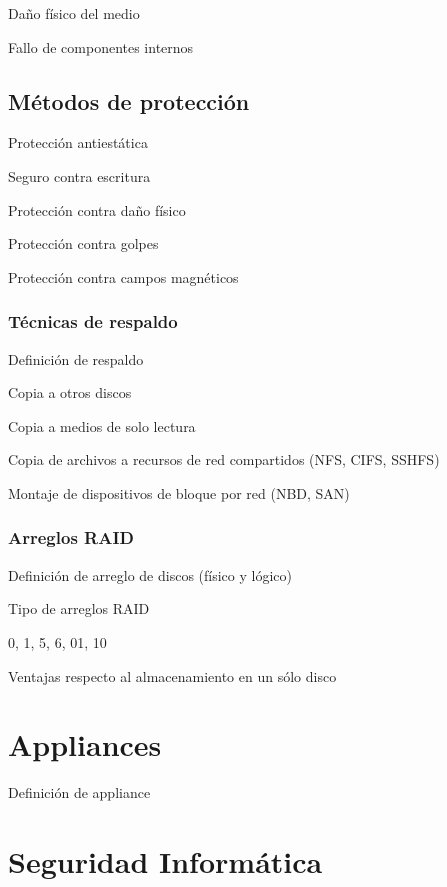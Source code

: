 Da\~{n}o f\'{i}sico del medio

Fallo de componentes internos



      \subsection {M\'{e}todos de protecci\'{o}n}

Protecci\'{o}n antiest\'{a}tica

Seguro contra escritura

Protecci\'{o}n contra da\~{n}o f\'{i}sico

Protecci\'{o}n contra golpes

Protecci\'{o}n contra campos magn\'{e}ticos

        \subsubsection {T\'{e}cnicas de respaldo}

Definici\'{o}n de respaldo

Copia a otros discos

Copia a medios de solo lectura

Copia de archivos a recursos de red compartidos (NFS, CIFS, SSHFS)

Montaje de dispositivos de bloque por red (NBD, SAN)

        \subsubsection {Arreglos RAID}

Definici\'{o}n de arreglo de discos (f\'{i}sico y l\'{o}gico)

Tipo de arreglos RAID

0, 1, 5, 6, 01, 10

Ventajas respecto al almacenamiento en un s\'{o}lo disco

    \section {Appliances}

Definici\'{o}n de appliance

    \section {Seguridad Inform\'{a}tica}
    
